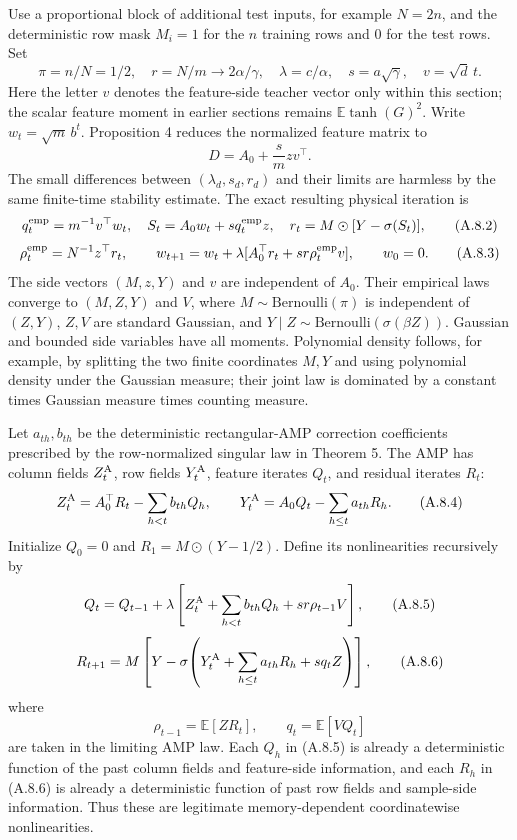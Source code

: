 \documentclass[
  11pt,
  a4paper,
]{article}
\begin{document}
Use a proportional block of additional test inputs, for example
\(N=2n\), and the deterministic row mask \(M_i=1\) for the \(n\)
training rows and \(0\) for the test rows. Set \[
\pi=n/N=1/2,\quad r=N/m\to2\alpha/\gamma,\quad
\lambda= c/\alpha,\quad s=a\sqrt\gamma,\quad v=\sqrt d\,t.
\tag{A.8.1}
\] Here the letter \(v\) denotes the feature-side teacher vector only
within this section; the scalar feature moment in earlier sections
remains \(\mathbb E\tanh(G)^2\). Write \(w_t=\sqrt m\,b^t\). Proposition
4 reduces the normalized feature matrix to \[
D=A_0+\frac{s}{m}zv^\top.
\] The small differences between \((\lambda_d,s_d,r_d)\) and their
limits are harmless by the same finite-time stability estimate. The
exact resulting physical iteration is \[
q_t^{\rm emp}=m^{-1}v^\top w_t,\quad
S_t=A_0w_t+s q_t^{\rm emp}z,\quad
r_t=M\odot[Y-\sigma(S_t)],
\tag{A.8.2}
\] \[
\rho_t^{\rm emp}=N^{-1}z^\top r_t,\qquad
w_{t+1}=w_t+\lambda[A_0^\top r_t+s r\rho_t^{\rm emp}v],\qquad w_0=0.
\tag{A.8.3}
\] The side vectors \((M,z,Y)\) and \(v\) are independent of \(A_0\).
Their empirical laws converge to \((M,Z,Y)\) and \(V\), where
\(M\sim\mathrm{Bernoulli}(\pi)\) is independent of \((Z,Y)\), \(Z,V\)
are standard Gaussian, and
\(Y\mid Z\sim\mathrm{Bernoulli}(\sigma(\beta Z))\). Gaussian and bounded
side variables have all moments. Polynomial density follows, for
example, by splitting the two finite coordinates \(M,Y\) and using
polynomial density under the Gaussian measure; their joint law is
dominated by a constant times Gaussian measure times counting measure.

Let \(a_{th},b_{th}\) be the deterministic rectangular-AMP correction
coefficients prescribed by the row-normalized singular law in Theorem 5.
The AMP has column fields \(Z_t^{\rm A}\), row fields \(Y_t^{\rm A}\),
feature iterates \(Q_t\), and residual iterates \(R_t\): \[
Z_t^{\rm A}=A_0^\top R_t-\sum_{h<t}b_{th}Q_h,\qquad
Y_t^{\rm A}=A_0Q_t-\sum_{h\le t}a_{th}R_h.
\tag{A.8.4}
\] Initialize \(Q_0=0\) and \(R_1=M\odot(Y-1/2)\). Define its
nonlinearities recursively by \[
Q_t=Q_{t-1}+\lambda\left[Z_t^{\rm A}+\sum_{h<t}b_{th}Q_h+s r\rho_{t-1}V\right],
\tag{A.8.5}
\] \[
R_{t+1}=M\left[Y-\sigma\!\left(Y_t^{\rm A}+\sum_{h\le t}a_{th}R_h+s q_tZ\right)\right],
\tag{A.8.6}
\] where \[
\rho_{t-1}=\mathbb E[Z R_t],\qquad q_t=\mathbb E[VQ_t]
\tag{A.8.7}
\] are taken in the limiting AMP law. Each \(Q_h\) in (A.8.5) is already
a deterministic function of the past column fields and feature-side
information, and each \(R_h\) in (A.8.6) is already a deterministic
function of past row fields and sample-side information. Thus these are
legitimate memory-dependent coordinatewise nonlinearities.
\end{document}
